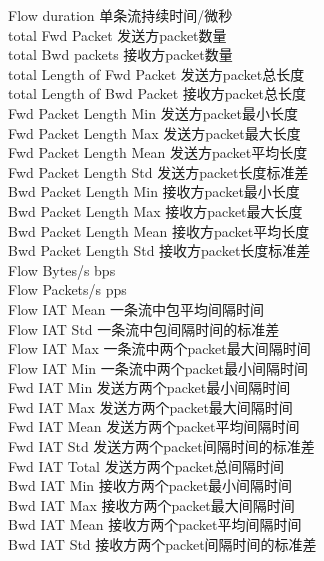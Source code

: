 Flow duration  单条流持续时间/微秒 \\
total Fwd Packet		发送方packet数量 \\
total Bwd packets		接收方packet数量 \\
total Length of Fwd Packet	发送方packet总长度 \\
total Length of Bwd Packet	接收方packet总长度 \\
Fwd Packet Length Min 		发送方packet最小长度 \\
Fwd Packet Length Max 		发送方packet最大长度 \\
Fwd Packet Length Mean		发送方packet平均长度 \\
Fwd Packet Length Std		发送方packet长度标准差 \\
Bwd Packet Length Min		接收方packet最小长度 \\
Bwd Packet Length Max		接收方packet最大长度 \\
Bwd Packet Length Mean		接收方packet平均长度 \\
Bwd Packet Length Std		接收方packet长度标准差 \\
Flow Bytes/s			bps \\
Flow Packets/s			pps  \\
Flow IAT Mean			一条流中包平均间隔时间 \\
Flow IAT Std			一条流中包间隔时间的标准差 \\
Flow IAT Max			一条流中两个packet最大间隔时间 \\
Flow IAT Min			一条流中两个packet最小间隔时间 \\
Fwd IAT Min			发送方两个packet最小间隔时间\\
Fwd IAT Max			发送方两个packet最大间隔时间 \\
Fwd IAT Mean			发送方两个packet平均间隔时间 \\
Fwd IAT Std			发送方两个packet间隔时间的标准差 \\
Fwd IAT Total   		发送方两个packet总间隔时间\\
Bwd IAT Min			接收方两个packet最小间隔时间\\
Bwd IAT Max			接收方两个packet最大间隔时间\\
Bwd IAT Mean			接收方两个packet平均间隔时间 \\
Bwd IAT Std			接收方两个packet间隔时间的标准差 \\
